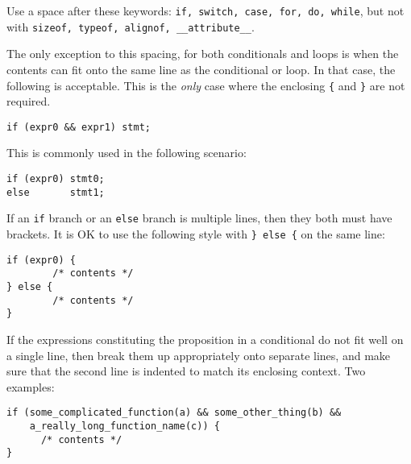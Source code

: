 \documentclass[11pt,onecolumn]{article}
\newcommand{\head}[1]{\vspace{0.4em}\noindent{\bf #1}}
\begin{document}
Use a space after these keywords: {\tt if, switch, case, for, do,
  while}, but not with {\tt sizeof, typeof, alignof,
  \_\_attribute\_\_}.

The only exception to this spacing, for both conditionals and loops is
when the contents can fit onto the same line as the conditional or
loop.  In that case, the following is acceptable.  This is the {\em
  only} case where the enclosing {\tt \{} and {\tt \}} are not
required.

    \begin{minipage}{3in}
      \footnotesize
      \lstset{language=C}
      \begin{lstlisting}
if (expr0 && expr1) stmt;
      \end{lstlisting}
    \end{minipage}

This is commonly used in the following scenario:

    \begin{minipage}{3in}
      \footnotesize
      \lstset{language=C}
      \begin{lstlisting}
if (expr0) stmt0;
else       stmt1;
      \end{lstlisting}
    \end{minipage}

If an {\tt if} branch or an {\tt else} branch is multiple lines, then
they both must have brackets.  It is OK to use the following style
with {\tt \} else \{} on the same line:

    \begin{minipage}{3in}
      \footnotesize
      \lstset{language=C}
      \begin{lstlisting}
if (expr0) {
        /* contents */
} else {
        /* contents */
}
      \end{lstlisting}
    \end{minipage}


\head{Breaking up lines.}  If the expressions constituting the
proposition in a conditional do not fit well on a single line, then
break them up appropriately onto separate lines, and make sure that
the second line is indented to match its enclosing context.  Two
examples:

    \begin{minipage}{3in}
      \footnotesize
      \lstset{language=C}
      \begin{lstlisting}
if (some_complicated_function(a) && some_other_thing(b) &&
    a_really_long_function_name(c)) {
      /* contents */
}
      \end{lstlisting}
    \end{minipage}
\end{document}
